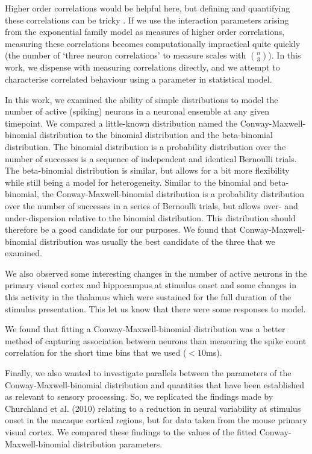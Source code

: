 Higher order correlations would be helpful here, but defining and quantifying these correlations can be tricky \parencite{staude}. If we use the interaction parameters arising from the exponential family model as measures of higher order correlations, measuring these correlations becomes computationally impractical quite quickly (the number of `three neuron correlations' to measure scales with $\binom{n}{3}$). In this work, we dispense with measuring correlations directly, and we attempt to characterise correlated behaviour using a parameter in statistical model.

In this work, we examined the ability of simple distributions to model the number of active (spiking) neurons in a neuronal ensemble at any given timepoint. We compared a little-known distribution named the Conway-Maxwell-binomial distribution to the binomial distribution and the beta-binomial distribution. The binomial distribution is a probability distribution over the number of successes is a sequence of independent and identical Bernoulli trials. The beta-binomial distribution is similar, but allows for a bit more flexibility while still being a model for heterogeneity. Similar to the binomial and beta-binomial, the Conway-Maxwell-binomial distribution is a probability distribution over the number of successes in a series of Bernoulli trials, but allows over- and under-dispersion relative to the binomial distribution. This distribution should therefore be a good candidate for our purposes. We found that Conway-Maxwell-binomial distribution was usually the best candidate of the three that we examined.

We also observed some interesting changes in the number of active neurons in the primary visual cortex and hippocampus at stimulus onset and some changes in this activity in the thalamus which were sustained for the full duration of the stimulus presentation. This let us know that there were some responses to model.

We found that fitting a Conway-Maxwell-binomial distribution was a better method of capturing association between neurons than measuring the spike count correlation for the short time bins that we used ($<10$ms).

Finally, we also wanted to investigate parallels between the parameters of the Conway-Maxwell-binomial distribution and quantities that have been established as relevant to sensory processing. So, we replicated the findings made by Churchland et al. (2010) relating to a reduction in neural variability at stimulus onset in the macaque cortical regions, but for data taken from the mouse primary visual cortex. We compared these findings to the values of the fitted Conway-Maxwell-binomial distribution parameters.

